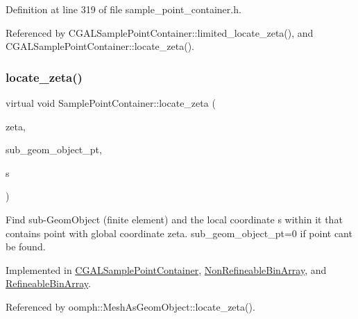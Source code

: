 Definition at line 319 of file sample\+\_\+point\+\_\+container.\+h.



Referenced by C\+G\+A\+L\+Sample\+Point\+Container\+::limited\+\_\+locate\+\_\+zeta(), and C\+G\+A\+L\+Sample\+Point\+Container\+::locate\+\_\+zeta().

\mbox{\label{classSamplePointContainer_acca8dbae8346d6c8924b1f815aa5f049}} 
\subsubsection{\texorpdfstring{locate\+\_\+zeta()}{locate\_zeta()}}
{\footnotesize\ttfamily virtual void Sample\+Point\+Container\+::locate\+\_\+zeta (\begin{DoxyParamCaption}\item[{const Vector$<$ double $>$ \&}]{zeta,  }\item[{Geom\+Object $\ast$\&}]{sub\+\_\+geom\+\_\+object\+\_\+pt,  }\item[{Vector$<$ double $>$ \&}]{s }\end{DoxyParamCaption})\hspace{0.3cm}{\ttfamily [pure virtual]}}



Find sub-\/\+Geom\+Object (finite element) and the local coordinate s within it that contains point with global coordinate zeta. sub\+\_\+geom\+\_\+object\+\_\+pt=0 if point can\textquotesingle{}t be found. 



Implemented in \hyperlink{classCGALSamplePointContainer_a059a8f0ebd74ffbc48722122b01e172b}{C\+G\+A\+L\+Sample\+Point\+Container}, \hyperlink{classNonRefineableBinArray_a27abcdeac898d37af63968ed97427e36}{Non\+Refineable\+Bin\+Array}, and \hyperlink{classRefineableBinArray_a4f2f78efe9b05fda23d94e857d00cfa1}{Refineable\+Bin\+Array}.



Referenced by oomph\+::\+Mesh\+As\+Geom\+Object\+::locate\+\_\+zeta().

\mbox{\label{classSamplePointContainer_ad38b50923288cd35ff5e24ada05d0c59}} 
